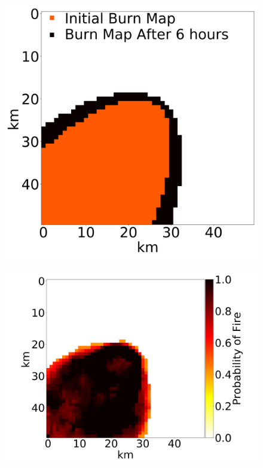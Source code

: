 \documentclass[smallcondensed]{svjour3}     %
\begin{document}
\begin{figure}[htbp]
	\includegraphics[height=0.17\textheight]{exampleFusedFire2.png}
	~
	\includegraphics[height=0.17\textheight]{exampleNetworkProcessed2.png}
	~

\end{figure}
\end{document}
